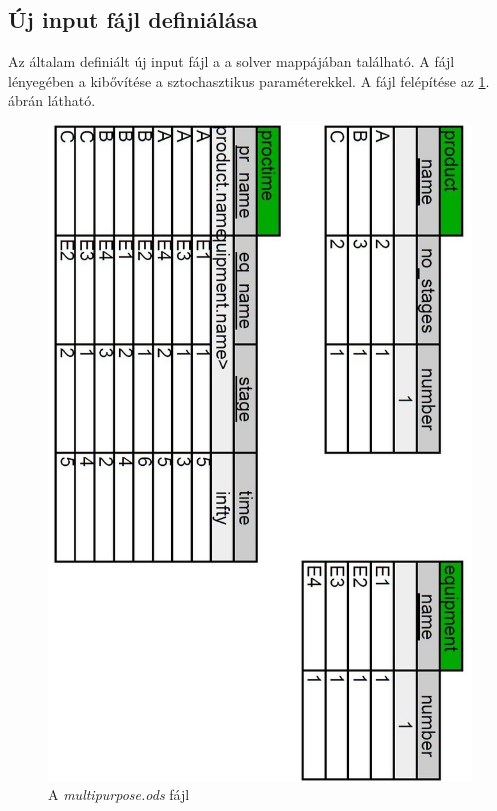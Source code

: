 \subsection{Új input fájl definiálása}
Az általam definiált új input fájl a  a solver  mappájában található.
A fájl lényegében a  kibővítése a sztochasztikus paraméterekkel.
A  fájl felépítése az \ref{multipurpose_odshere}. ábrán látható.
\begin{figure}[H]
\begin{center}
\includegraphics[scale=0.375]{multipurposeOds}
\caption{A \textit{multipurpose.ods} fájl}
\label{multipurpose_odshere}
\end{center}
\end{figure}
